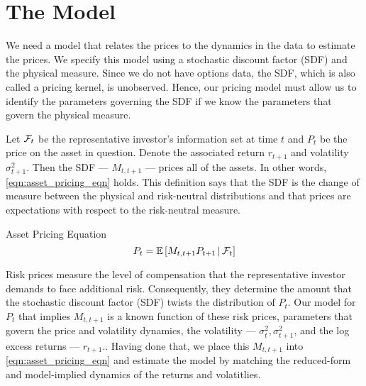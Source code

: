 \documentclass[11pt, letterpaper, twoside]{article}
\begin{document}
\section{The Model}\label{sec:model}

\addtocounter{subsection}{1}

We need a model that relates the prices to the dynamics in the data to estimate the prices. We specify this model using a stochastic discount factor (SDF) and the physical measure. Since we do not have options data, the SDF, which is also called a pricing kernel, is unobserved. Hence, our pricing model must allow us to identify the parameters governing the SDF if we know the parameters that govern the physical measure. 

Let $\mathcal{F}_t$ be the representative investor's information set at time $t$ and $P_t$ be the price on the asset in question. Denote the associated return $r_{t+1}$ and volatility $\sigma^2_{t+1}$. Then the SDF --- $M_{t,t+1}$ --- prices all of the assets. In other words, \cref{eqn:asset_pricing_eqn} holds. This definition says that the SDF is the change of measure between the physical and risk-neutral distributions and that prices are expectations with respect to the risk-neutral measure.

\begin{defn}{Asset Pricing Equation}
  \label{eqn:asset_pricing_eqn}
  \begin{equation}
    P_t = \operatorname{\mathbb{E}}\left[M_{t,t+1} P_{t+1} \,\middle\vert\, \mathcal{F}_t \right] 
  \end{equation}
\end{defn}

Risk prices measure the level of compensation that the representative investor demands to face additional risk. Consequently, they determine the amount that the stochastic discount factor (SDF) twists the distribution of $P_t$. Our model for $P_t$ that implies $M_{t,t+1}$ is a known function of these risk prices, parameters that govern the price and volatility dynamics, the volatility --- $\sigma^2_{t}, \sigma^2_{t+1}$, and the log excess returns --- $r_{t+1}$.. Having done that, we place this $M_{t,t+1}$ into \cref{eqn:asset_pricing_eqn} and estimate the model by matching the reduced-form and model-implied dynamics of the returns and volatitlies.
\end{document}
